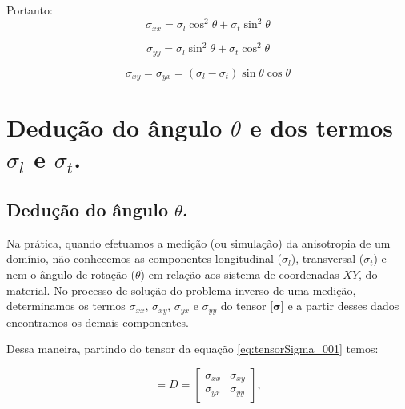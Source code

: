 \documentclass[
12pt,
a4paper,
oneside,
chapter=TITLE,
sumario=tradicional
]{abntex2}
\begin{document}
Portanto:
\begin{equation}
\sigma_{xx}
=
\sigma_l \cos^2\theta + \sigma_t \sin^2\theta  
\label{eq:Sxx_001}
\end{equation}

\begin{equation}
\sigma_{yy}
=
\sigma_l \sin^2\theta + \sigma_t \cos^2\theta  
\label{eq:Syy_001}
\end{equation}

\begin{equation}
	\sigma_{xy} = \sigma_{yx}
	=
    (\sigma_l-\sigma_t)\sin\theta\cos\theta 
	\label{eq:Sxy_001}
\end{equation}

\section{Dedução do ângulo $\theta$ e dos termos $\sigma_l$ e $\sigma_t$.} {\label{Sl_St_theta}}
\subsection{Dedução do ângulo $\theta$.}


Na prática, quando efetuamos a medição (ou simulação) da anisotropia de um domínio, não conhecemos as componentes longitudinal ($\sigma_l$), transversal ($\sigma_t$) e nem o ângulo de rotação ($\theta$) em relação aos sistema de coordenadas $XY$, do material. No processo de solução do problema inverso de uma medição,  determinamos os termos $\sigma_{xx}$, $\sigma_{xy}$, $\sigma_{yx}$ e $\sigma_{yy}$  do tensor [$\mathbf{\sigma}$] e a partir desses dados encontramos os demais componentes.

Dessa maneira, partindo do tensor da equação \ref{eq:tensorSigma_001} temos:

\begin{equation} %
   [\mathbf{\sigma}] = D =
	\begin{bmatrix}  
		\sigma_{xx} & \sigma_{xy} \\  
		\sigma_{yx} &\sigma_{yy} 
		\label{eq:tensorSigma_002}
	\end{bmatrix}, 	
\end{equation}
\end{document}
